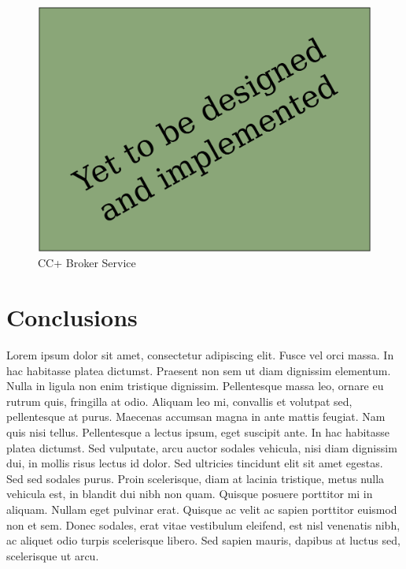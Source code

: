 \documentclass[botnum,fleqn,final]{unmeethesis}
\begin{document}
\begin{figure}[!htpb]
    \begin{center}
            \includegraphics[width=1.0\textwidth]{todo.pdf}
    \end{center}
    \caption[CC+ Broker Service]{CC+ Broker Service}
    \label{fi:ccPlusBrokerService}
\end{figure}

\chapter{\label{chapter:conc}Conclusions}

Lorem ipsum dolor sit amet, consectetur adipiscing elit. Fusce vel orci massa.
In hac habitasse platea dictumst. Praesent non sem ut diam dignissim elementum.
Nulla in ligula non enim tristique dignissim. Pellentesque massa leo, ornare eu
rutrum quis, fringilla at odio. Aliquam leo mi, convallis et volutpat sed,
pellentesque at purus. Maecenas accumsan magna in ante mattis feugiat. Nam quis
nisi tellus. Pellentesque a lectus ipsum, eget suscipit ante. In hac habitasse
platea dictumst. Sed vulputate, arcu auctor sodales vehicula, nisi diam
dignissim dui, in mollis risus lectus id dolor. Sed ultricies tincidunt elit
sit amet egestas. Sed sed sodales purus. Proin scelerisque, diam at lacinia
tristique, metus nulla vehicula est, in blandit dui nibh non quam. Quisque
posuere porttitor mi in aliquam. Nullam eget pulvinar erat. Quisque ac velit ac
sapien porttitor euismod non et sem. Donec sodales, erat vitae vestibulum
eleifend, est nisl venenatis nibh, ac aliquet odio turpis scelerisque libero.
Sed sapien mauris, dapibus at luctus sed, scelerisque ut arcu.
\end{document}
